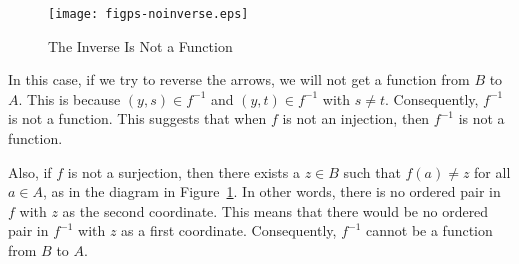 \begin{figure}[h]
\begin{center}
\texttt{[image: figps-noinverse.eps]}
\caption{The Inverse Is Not a Function} \label{fig:inversenotfunction}
\end{center}
\end{figure}


In this case, if we try to reverse the arrows, we will not get a function from  $B$  to  $A$.  This is because  $( {y, s} ) \in f^{ - 1} $  and  
$( {y, t} ) \in f^{ - 1} $ with  $s \ne t$.  Consequently,  $f^{ - 1} $  is not a function.  This suggests that when  $f$  is not an injection, then  $f^{ - 1} $  is not a function.  

Also, if  $f$  is not a surjection, then there exists a  $z \in B$ such that  
$f( a ) \ne z$ for all  $a \in A$, as in the diagram in 
Figure~\ref{fig:inversenotfunction}.  In other words, there is no ordered pair in  $f$  with  $z$  as the second coordinate.  This means that there would be no ordered pair in  
$f^{ - 1} $  with  $z$  as a first coordinate.  Consequently, $f^{ - 1} $  cannot be a function from  $B$  to  $A$.

